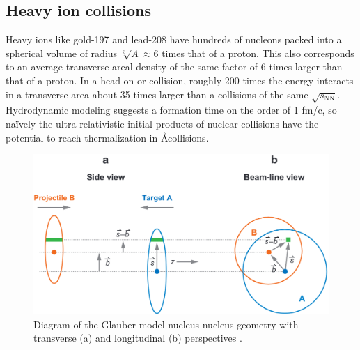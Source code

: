 \subsection{Heavy ion collisions}

Heavy ions like gold-197 and lead-208 have hundreds of nucleons packed into a spherical volume of radius $\sqrt[3]{A} \approx 6$ times that of a proton.
This also corresponds to an average transverse areal density of the same factor of 6 times larger than that of a proton.
In a head-on \AuAu or \PbPb collision, roughly 200 times the energy interacts in a transverse area about 35 times larger than a \pp collisions of the same $\sqrt{s_\mathrm{NN}}$.
Hydrodynamic modeling suggests a formation time on the order of 1 fm/c, so na\"ively the ultra-relativistic initial products of nuclear collisions have the potential to reach thermalization in \AA collisions.

\begin{figure}[t]
  \includegraphics{hi_collision_geo.png}
  \caption{Diagram of the Glauber model nucleus-nucleus geometry with transverse (a) and longitudinal (b) perspectives \cite{Miller:2007ri}.}
  \label{fig:hi_collision_geo}
\end{figure}

